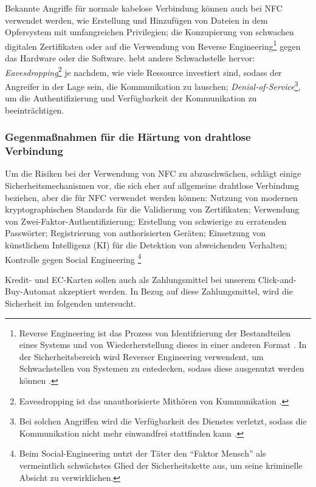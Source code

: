 Bekannte Angriffe für normale kabelose Verbindung können auch bei NFC verwendet werden\cite{refip:NYRS}, wie
Erstellung und Hinzufügen von Dateien in dem Opfersystem mit umfangreichen Privilegien; die Konzupierung
von schwachen digitalen Zertifikaten oder auf die Verwendung von Reverse Engineering\footnote{Reverse
Engineering ist das Prozess von Identifzierung der Bestandteilen eines Systems und von Wiederherstellung 
dieses in einer anderen Format \cite{refart:CHRE}. In der Sicherheitsbereich wird Reverser Engineering 
verwendent, um Schwachstellen von Systemen zu entedecken, sodass diese ausgenutzt werden können \cite{refip:CMBM}.} 
gegen das Hardware oder die Software. \cite{refart:ALSI} hebt andere Schwachstelle hervor: 
\textit{Eavesdropping}\footnote{Eavesdropping ist das unauthorisierte Mithören von Kummunikation \cite{refbook:SWIS}.}
je nachdem, wie viele Ressource investiert sind, sodass der Angreifer in der Lage sein, die Kommunikation
zu lauschen; \textit{Denial-of-Service}\footnote{Bei solchen Angriffen wird die Verfügbarkeit des Dienstes verletzt, 
sodass die Kommunikation nicht mehr einwandfrei stattfinden kann \cite{refbook:SWIS}.}, um die Authentifizierung
und Verfügbarkeit der Kommunikation zu beeinträchtigen.


\subsubsection{Gegenmaßnahmen für die Härtung von drahtlose Verbindung}

Um die Risiken bei der Verwendung von NFC zu abzuschwächen, schlägt \cite{refip:NYRS} einige Sicherheitsmechanismen vor, 
die sich eher auf allgemeine drahtlose Verbindung beziehen, aber die für NFC verwendet werden können: Nutzung von modernen 
kryptographischen Standards für die Validierung von Zertifikaten; Verwendung von Zwei-Faktor-Authentifizierung; Erstellung
von schwierige zu erratenden Passwörter; Registrierung von authorisierten Geräten; Einsetzung von künstlichem Intelligenz 
(KI) für die Detektion von abweichenden Verhalten; Kontrolle gegen Social Engineering \footnote{Beim Social-Engineering
nutzt der Täter den ``Faktor Mensch'' als vermeintlich schwächstes Glied der Sicherheitskette aus, um seine kriminelle
 Absicht zu verwirklichen.\cite{booklet:BSSE}}


 Kredit- und EC-Karten sollen auch als Zahlungsmittel bei unserem Click-and-Buy-Automat akzeptiert werden. 
In Bezug auf diese Zahlungsmittel, wird die Sicherheit im folgenden untersucht.

